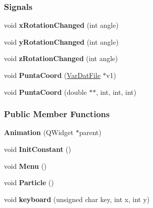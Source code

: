 \subsubsection*{\-Signals}
\begin{DoxyCompactItemize}
\item 
\hypertarget{classAnimation_a3ee26aac8a2fcea79a6b38dd7a4cba61}{void {\bfseries x\-Rotation\-Changed} (int angle)}\label{classAnimation_a3ee26aac8a2fcea79a6b38dd7a4cba61}

\item 
\hypertarget{classAnimation_a4760c62adb71794ef669f948eee3c604}{void {\bfseries y\-Rotation\-Changed} (int angle)}\label{classAnimation_a4760c62adb71794ef669f948eee3c604}

\item 
\hypertarget{classAnimation_aa8aec849822061b211a8e67691e0ae99}{void {\bfseries z\-Rotation\-Changed} (int angle)}\label{classAnimation_aa8aec849822061b211a8e67691e0ae99}

\item 
\hypertarget{classAnimation_ae1a9c67660ed6bcfb9839b0045d0263e}{void {\bfseries \-Punta\-Coord} (\hyperlink{classVarDatFile}{\-Var\-Dat\-File} $\ast$v1)}\label{classAnimation_ae1a9c67660ed6bcfb9839b0045d0263e}

\item 
\hypertarget{classAnimation_acbc1cbd5edc8e0a08391a999add774e3}{void {\bfseries \-Punta\-Coord} (double $\ast$$\ast$, int, int, int)}\label{classAnimation_acbc1cbd5edc8e0a08391a999add774e3}

\end{DoxyCompactItemize}
\subsubsection*{\-Public \-Member \-Functions}
\begin{DoxyCompactItemize}
\item 
\hypertarget{classAnimation_afa9802d69e8367d4b6677a508aa2e2a3}{{\bfseries \-Animation} (\-Q\-Widget $\ast$parent)}\label{classAnimation_afa9802d69e8367d4b6677a508aa2e2a3}

\item 
\hypertarget{classAnimation_ac0790850f6751e5fe0f47d16d7f67255}{void {\bfseries \-Init\-Constant} ()}\label{classAnimation_ac0790850f6751e5fe0f47d16d7f67255}

\item 
\hypertarget{classAnimation_afdf1ca9e7afc3e7ec41b47fea4b3d80d}{void {\bfseries \-Menu} ()}\label{classAnimation_afdf1ca9e7afc3e7ec41b47fea4b3d80d}

\item 
\hypertarget{classAnimation_abd86c6f19dd760d1ed1dce36d290582d}{void {\bfseries \-Particle} ()}\label{classAnimation_abd86c6f19dd760d1ed1dce36d290582d}

\item 
\hypertarget{classAnimation_aef7ba2f69afb2d954545f64c7fe24b14}{void {\bfseries keyboard} (unsigned char key, int x, int y)}\label{classAnimation_aef7ba2f69afb2d954545f64c7fe24b14}

\end{DoxyCompactItemize}

